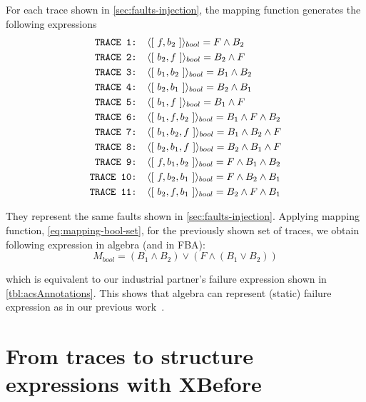 \documentclass[12pt,openright,twoside,a4paper,oldfontcommands,english,brazil,final]{abntex2}
\theoremstyle{theo}
\def\possessiveembraer{%
  our industrial partner's%
  \xspace%
}
\newcommand{\tracetobool}[1]{\ensuremath\langle{#1}\rangle_{bool}}
\newcommand{\trace}[1]{\ensuremath\left[~#1~\right]}
\begin{document}
For each trace shown in \cref{sec:faults-injection}, the mapping function generates the following expressions
%
\begin{align*}
\text{\texttt{TRACE 1: }}&\tracetobool{\trace{f,b_2}} = F \land B_2 \\
\text{\texttt{TRACE 2: }}&\tracetobool{\trace{b_2,f}} = B_2 \land F \\
\text{\texttt{TRACE 3: }}&\tracetobool{\trace{b_1,b_2}} = B_1 \land B_2 \\
\text{\texttt{TRACE 4: }}&\tracetobool{\trace{b_2,b_1}} = B_2 \land B_1 \\
\text{\texttt{TRACE 5: }}&\tracetobool{\trace{b_1,f}} = B_1 \land F \\
\text{\texttt{TRACE 6: }}&\tracetobool{\trace{b_1,f,b_2}} = B_1 \land F \land B_2 \\
\text{\texttt{TRACE 7: }}&\tracetobool{\trace{b_1,b_2,f}} = B_1 \land B_2 \land F \\
\text{\texttt{TRACE 8: }}&\tracetobool{\trace{b_2,b_1,f}} = B_2 \land B_1 \land F \\
\text{\texttt{TRACE 9: }}&\tracetobool{\trace{f,b_1,b_2}} = F \land B_1 \land B_2 \\
\text{\texttt{TRACE 10: }}&\tracetobool{\trace{f,b_2,b_1}} = F \land B_2 \land B_1 \\
\text{\texttt{TRACE 11: }}&\tracetobool{\trace{b_2,f,b_1}} = B_2 \land F \land B_1 
\end{align*}

They represent the same faults shown in \cref{sec:faults-injection}.
%
Applying mapping function, \cref{eq:mapping-bool-set}, for the previously shown set of traces, we obtain  following expression in \ac{algebra} (and in \ac{FBA}):
%
\begin{equation}
M_{bool} = (B_1 \land B_2) \lor (F \land (B_1 \lor B_2))\label{eq:m-bool}
\end{equation}

%
which is equivalent to \possessiveembraer failure expression shown in \cref{tbl:acsAnnotations}.
%
This shows that \ac{algebra} can represent (static) failure expression as in our previous work~\cite{DM2012}.

\section{From traces to structure expressions with \acs*{XBefore}}
\label{sec:traces-to-structure-expressions-algebra-operators}
\end{document}
